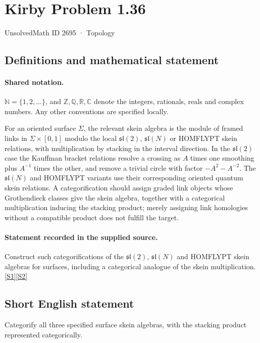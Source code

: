 \documentclass[11pt]{article}
\newcommand{\sref}[2]{\hyperlink{source:#1:#2}{[S#2]}}
\begin{document}
\setcounter{section}{2694}
\section{Kirby Problem 1.36}\label{2695}
{\small\sffamily UnsolvedMath ID 2695 · Topology}
\subsection{Definitions and mathematical statement}

\paragraph{Shared notation.}$\mathbb N=\{1,2,\ldots\}$, and $\mathbb Z,\mathbb Q,\mathbb R,\mathbb C$ denote the integers, rationals, reals and complex numbers. Any other conventions are specified locally.


For an oriented surface $\Sigma$, the relevant skein algebra is the module of framed links in $\Sigma\times[0,1]$ modulo the local $\mathfrak{sl}(2)$, $\mathfrak{sl}(N)$ or HOMFLYPT skein relations, with multiplication by stacking in the interval direction. In the $\mathfrak{sl}(2)$ case the Kauffman bracket relations resolve a crossing as $A$ times one smoothing plus $A^{-1}$ times the other, and remove a trivial circle with factor $-A^2-A^{-2}$. The $\mathfrak{sl}(N)$ and HOMFLYPT variants use their corresponding oriented quantum skein relations. A categorification should assign graded link objects whose Grothendieck classes give the skein algebra, together with a categorical multiplication inducing the stacking product; merely assigning link homologies without a compatible product does not fulfill the target.
\paragraph{Statement recorded in the supplied source.}
Construct such categorifications of the $\mathfrak{sl}(2)$, $\mathfrak{sl}(N)$ and HOMFLYPT skein algebras for surfaces, including a categorical analogue of the skein multiplication. \sref{2695}{1}\sref{2695}{2}
\subsection{Short English statement}
Categorify all three specified surface skein algebras, with the stacking product represented categorically.
\end{document}
